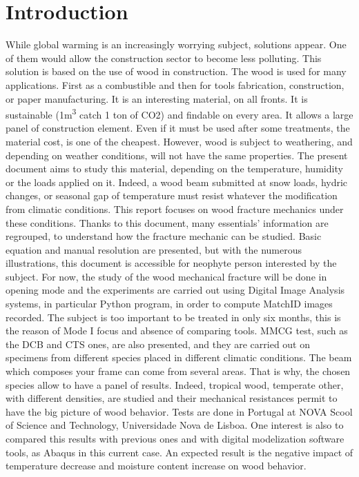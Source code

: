 
\chapter{Introduction} %

\label{Introduction} %


While global warming is an increasingly worrying subject, solutions appear. One of them would allow the construction sector to become less polluting. This solution is based on the use of wood in construction. The wood is used for many applications. First as a combustible and then for tools fabrication, construction, or paper manufacturing. It is an interesting material, on all fronts. It is sustainable (1\si{\cubic\meter} catch 1 ton of CO2) and findable on every area. It allows a large panel of construction element. Even if it must be used after some treatments, the material cost, is one of the cheapest. However, wood is subject to weathering, and depending on weather conditions, will not have the same properties. The present document aims to study this material, depending on the temperature, humidity or the loads applied on it. Indeed, a wood beam submitted at snow loads, hydric changes, or seasonal gap of temperature must resist whatever the modification from climatic conditions. This report focuses on wood fracture mechanics under these conditions.
\newline 
Thanks to this document, many essentials' information are regrouped, to understand how the fracture mechanic can be studied. Basic equation and manual resolution are presented, but with the numerous illustrations, this document is accessible for neophyte person interested by the subject.
For now, the study of the wood mechanical fracture will be done in opening mode and the experiments are carried out using Digital Image Analysis systems, in particular Python program, in order to compute MatchID images recorded. The subject is too important to be treated in only six months, this is the reason of Mode I focus and absence of comparing tools. 
\newline
MMCG test, such as the DCB and CTS ones, are also presented, and they are carried out on specimens from different species placed in different climatic conditions. The beam which composes your frame can come from several areas. That is why, the chosen species allow to have a panel of results. Indeed, tropical wood, temperate other, with different densities, are studied and their mechanical resistances permit to have the big picture of wood behavior. 
\newline
Tests are done in Portugal at NOVA Scool of Science and Technology, Universidade Nova de Lisboa. One interest is also to compared this results with previous ones and with digital modelization software tools, as Abaqus in this current case. An expected result is the negative impact of temperature decrease and moisture content increase on wood behavior.